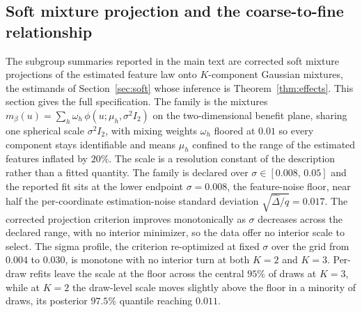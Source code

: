 \documentclass[11pt]{article}
\begin{document}
\subsection{Soft mixture projection and the coarse-to-fine relationship}\label{sec:app:hillstrom_k3}

The subgroup summaries reported in the main text are corrected soft mixture projections of the estimated feature law onto $K$-component Gaussian mixtures, the estimands of Section~\ref{sec:soft} whose inference is Theorem~\ref{thm:effects}. This section gives the full specification. The family is the mixtures $m_\beta(u)=\sum_{h}\omega_h\,\phi(u;\mu_h,\sigma^2 I_2)$ on the two-dimensional benefit plane, sharing one spherical scale $\sigma^2 I_2$, with mixing weights $\omega_h$ floored at $0.01$ so every component stays identifiable and means $\mu_h$ confined to the range of the estimated features inflated by $20\%$. The scale is a resolution constant of the description rather than a fitted quantity. The family is declared over $\sigma\in[0.008,\,0.05]$ and the reported fit sits at the lower endpoint $\sigma=0.008$, the feature-noise floor, near half the per-coordinate estimation-noise standard deviation $\sqrt{\widehat\Delta/q}=0.017$. The corrected projection criterion improves monotonically as $\sigma$ decreases across the declared range, with no interior minimizer, so the data offer no interior scale to select. The sigma profile, the criterion re-optimized at fixed $\sigma$ over the grid from $0.004$ to $0.030$, is monotone with no interior turn at both $K=2$ and $K=3$. Per-draw refits leave the scale at the floor across the central $95\%$ of draws at $K=3$, while at $K=2$ the draw-level scale moves slightly above the floor in a minority of draws, its posterior $97.5\%$ quantile reaching $0.011$.
\end{document}

